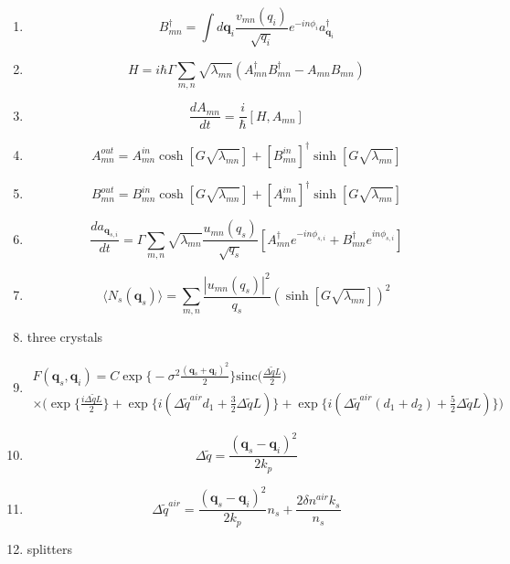 \documentclass[12pt]{article}
\begin{document}
\begin{enumerate}
\item $$ B_{mn}^{\dag} = \int d\mathbf{q}_{i} \frac{v_{mn}(q_{i})}{\sqrt{q_{i}}} e^{-in\phi_{i}} a_{\mathbf{q}_{i}}^{\dag} $$

\item $$ H = i \hbar \Gamma \sum_{m,n} \sqrt{\lambda_{mn}} (A_{mn}^{\dag} B_{mn}^{\dag} - A_{mn}B_{mn}) $$

\item $$  \frac{dA_{mn}}{dt} = \frac{i}{\hbar}[H,A_{mn}] $$ 

\item $$ A_{mn}^{out} = A_{mn}^{in}\cosh[G\sqrt{\lambda_{mn}}] + [B_{mn}^{in}]^{\dag}\sinh[G\sqrt{\lambda_{mn}}] $$

\item $$ B_{mn}^{out} = B_{mn}^{in}\cosh[G\sqrt{\lambda_{mn}}] + [A_{mn}^{in}]^{\dag}\sinh[G\sqrt{\lambda_{mn}}] $$

\item $$ \frac{d a_{\mathbf{q}_{s,i}}}{dt} = \Gamma \sum_{m,n} \sqrt{\lambda_{mn}} \frac{u_{mn}(q_{s})}{\sqrt{q_{s}}} [A_{mn}^{\dag} e^{-in\phi_{s,i}} + B_{mn}^{\dag} e^{in\phi_{s,i}}  ] $$

\item $$ \langle N_{s}(\mathbf{q}_{s}) \rangle = \sum_{m,n} \frac{|u_{mn}(q_{s})|^{2}}{q_{s}} (\sinh[G\sqrt{\lambda_{mn}}])^{2}  $$

\item three crystals

\item 
\begin{multline} 
 F(\mathbf{q}_{s},\mathbf{q}_{i}) = C\exp\big\{-\sigma^2\frac{(\mathbf{q}_{s} + \mathbf{q}_{i})^2}{2}  \big\} \textrm{sinc}\Big(\frac{\Delta \widetilde{q} L}{2}\Big) \\
 \times \Big( \exp\big\{\frac{i \Delta \widetilde{q} L}{2}\big\} +
 \exp\big\{i(\Delta \widetilde{q}^{air} d_{1} + \frac{3}{2} \Delta \widetilde{q} L) \big\} + 
 \exp\big\{i(\Delta \widetilde{q}^{air} (d_{1} + d_{2}) + \frac{5}{2} \Delta \widetilde{q} L) \big\} 
  \Big) 
\end{multline}

\item $$ \Delta\widetilde{q} = \frac{(\mathbf{q}_{s} - \mathbf{q}_{i})^2}{2k_{p}} $$

\item $$ \Delta\widetilde{q}^{air} = \frac{(\mathbf{q}_{s} - \mathbf{q}_{i})^2}{2k_{p}}n_s + \frac{2\delta n^{air}k_s}{n_s} $$


\item splitters



\end{enumerate}
\end{document}
